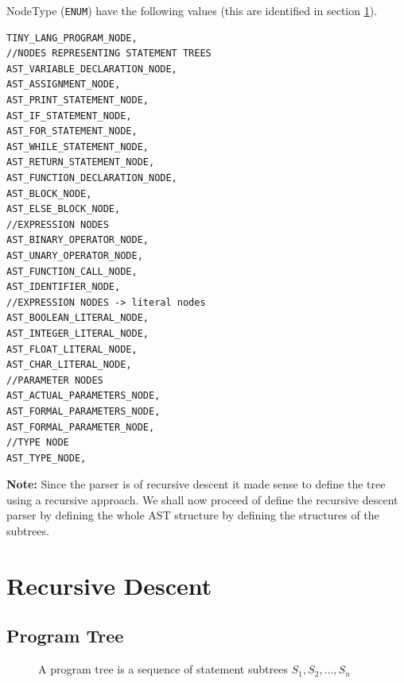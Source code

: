 NodeType (\verb!ENUM!) have the following values (this are identified in section \ref{sec:recursive descent}).
\begin{lstlisting}[caption=constants of \emph{ENUM \textbf{NodeType}},label=listing:enum nodetype]
TINY_LANG_PROGRAM_NODE,
//NODES REPRESENTING STATEMENT TREES
AST_VARIABLE_DECLARATION_NODE,
AST_ASSIGNMENT_NODE,
AST_PRINT_STATEMENT_NODE,
AST_IF_STATEMENT_NODE,
AST_FOR_STATEMENT_NODE,
AST_WHILE_STATEMENT_NODE,
AST_RETURN_STATEMENT_NODE,
AST_FUNCTION_DECLARATION_NODE,
AST_BLOCK_NODE,
AST_ELSE_BLOCK_NODE,
//EXPRESSION NODES
AST_BINARY_OPERATOR_NODE,
AST_UNARY_OPERATOR_NODE,
AST_FUNCTION_CALL_NODE,
AST_IDENTIFIER_NODE,
//EXPRESSION NODES -> literal nodes
AST_BOOLEAN_LITERAL_NODE,
AST_INTEGER_LITERAL_NODE,
AST_FLOAT_LITERAL_NODE,
AST_CHAR_LITERAL_NODE,
//PARAMETER NODES
AST_ACTUAL_PARAMETERS_NODE,
AST_FORMAL_PARAMETERS_NODE,
AST_FORMAL_PARAMETER_NODE,
//TYPE NODE
AST_TYPE_NODE,
\end{lstlisting}



\textbf{Note:} Since the parser is of recursive descent it made sense to define the tree using a recursive approach. We shall now proceed  of define the recursive descent parser by defining the whole AST  structure  by defining the structures of the subtrees.









\section{Recursive Descent}
\label{sec:recursive descent}
\subsection{Program Tree}
\begin{figure}[H]
    \centering
    \caption{A program tree is a sequence of statement subtrees $S_1,S_2,\ldots,S_n$}
    \label{fig:tinylang program tree}
\end{figure}
